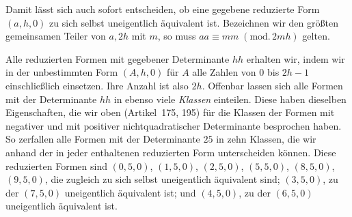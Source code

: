 Damit lässt sich auch sofort entscheiden, ob eine gegebene reduzierte Form $(a,h,0)$ zu sich selbst uneigentlich äquivalent ist. Bezeichnen wir den größten gemeinsamen Teiler von $a,2h$ mit $m$, so muss $aa\equiv mm\;(\mathrm{mod.}\,2mh)$ gelten.

Alle reduzierten Formen mit gegebener Determinante $hh$ erhalten wir, indem wir in der unbestimmten Form $(A,h,0)$ für $A$ alle Zahlen von $0$ bis $2h-1$ einschließlich einsetzen. Ihre Anzahl ist also $2h$. Offenbar lassen sich alle Formen mit der Determinante $hh$ in ebenso viele \textit{Klassen} einteilen. Diese haben dieselben Eigenschaften, die wir oben (Artikel~175, 195) für die Klassen der Formen mit negativer und mit positiver nichtquadratischer Determinante besprochen haben. So zerfallen alle Formen mit der Determinante $25$ in zehn Klassen, die wir anhand der in jeder enthaltenen reduzierten Form unterscheiden können. Diese reduzierten Formen sind $(0,5,0)$, $(1,5,0)$, $(2,5,0)$, $(5,5,0)$, $(8,5,0)$, $(9,5,0)$, die zugleich zu sich selbst uneigentlich äquivalent sind; $(3,5,0)$, zu der $(7,5,0)$ uneigentlich äquivalent ist; und $(4,5,0)$, zu der $(6,5,0)$ uneigentlich äquivalent ist.


